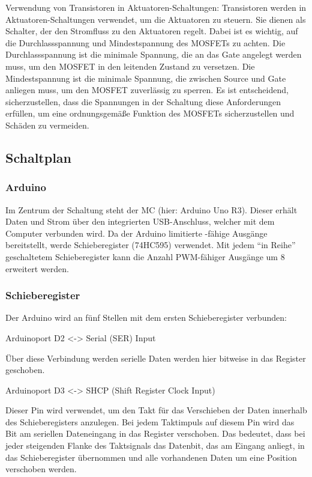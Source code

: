 Verwendung von Transistoren in Aktuatoren-Schaltungen:
Transistoren werden in Aktuatoren-Schaltungen verwendet, um die Aktuatoren
zu steuern. Sie dienen als Schalter, der den Stromfluss zu den Aktuatoren regelt.
Dabei ist es wichtig, auf die Durchlassspannung und Mindestspannung des MOSFETs zu achten. Die Durchlassspannung ist die
minimale Spannung, die an das Gate angelegt werden muss, um den MOSFET in den leitenden Zustand zu versetzen. Die
Mindestspannung ist die minimale Spannung, die zwischen Source und Gate anliegen muss, um den MOSFET zuverlässig zu
sperren.
Es ist entscheidend, sicherzustellen, dass die Spannungen in der Schaltung diese Anforderungen erfüllen, um
eine ordnungsgemäße Funktion des MOSFETs sicherzustellen und Schäden zu vermeiden.


\subsection{Schaltplan} \label{subsec:schaltplan}
\subsubsection{Arduino}

Im Zentrum der Schaltung steht der \ac{MC} (hier: Arduino Uno R3).
Dieser erhält Daten und Strom über den integrierten USB-Anschluss, welcher mit dem Computer verbunden wird.
Da der Arduino limitierte -fähige Ausgänge bereitstellt, werde Schieberegister (74HC595) verwendet.
Mit jedem \enquote{in Reihe} geschaltetem Schieberegister kann die Anzahl \ac{PWM}-fähiger Ausgänge um 8 erweitert werden.

\subsubsection{Schieberegister}

Der Arduino wird an fünf Stellen mit dem ersten Schieberegister verbunden:

Arduinoport D2 <-> Serial (SER) Input

Über diese Verbindung werden serielle Daten werden hier bitweise in das Register geschoben.

Arduinoport D3 <-> SHCP (Shift Register Clock Input)

Dieser Pin wird verwendet, um den Takt für das Verschieben der Daten innerhalb des Schieberegisters anzulegen.
Bei jedem Taktimpuls auf diesem Pin wird das Bit am seriellen Dateneingang in das Register verschoben.
Das bedeutet, dass bei jeder steigenden Flanke des Taktsignals das Datenbit, das am Eingang anliegt, in das Schieberegister übernommen und alle vorhandenen Daten um eine Position verschoben werden.

